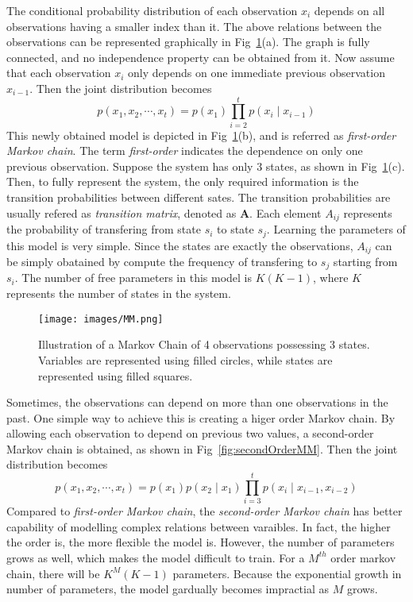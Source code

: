 The conditional probability distribution of each observation \(x_i\) depends on all observations having a smaller index than it. The above relations between the observations can be represented graphically in Fig~\ref{fig:MM}(a). The graph is fully connected, and no independence property can be obtained from it. Now assume that each observation \(x_i\) only depends on one immediate previous observation \(x_{i-1}\). Then the joint distribution becomes 
\begin{equation}
	p(x_1, x_2, \cdots, x_t) = p(x_1)\prod_{i = 2}^{t} p(x_i \mid x_{i-1})
\end{equation}
This newly obtained model is depicted in Fig~\ref{fig:MM}(b), and is referred as \textit{first-order Markov chain}. The term \textit{first-order} indicates the dependence on only one previous observation. Suppose the system has only 3 states, as shown in Fig~\ref{fig:MM}(c). Then, to fully represent the system, the only required information is the transition probabilities between different sates. The transition probabilities are usually refered as \textit{transition matrix}, denoted as \(\mathbf{A}\). Each element \(A_{ij}\) represents the probability of transfering from state \(s_i\) to state \(s_j\). Learning the parameters of this model is very simple. Since the states are exactly the observations, \(A_{ij}\) can be simply obatained by compute the frequency of transfering to \(s_j\) starting from \(s_i\). The number of free parameters in this model is \(K(K-1)\), where \(K\) represents the number of states in the system.

\begin{figure}[!ht]
	\begin{center}
		\texttt{[image: images/MM.png]}
		\caption{Illustration of a Markov Chain of 4 observations possessing 3 states. Variables are represented using filled circles, while states are represented using filled squares.}
		\label{fig:MM}
	\end{center}
\end{figure}

Sometimes, the observations can depend on more than one observations in the past. One simple way to achieve this is creating a higer order Markov chain. By allowing each observation to depend on previous two values, a second-order Markov chain is obtained, as shown in Fig~\ref{fig:secondOrderMM}. Then the joint distribution becomes
\begin{equation}
	p(x_1, x_2, \cdots, x_t) = p(x_1)p(x_2 \mid x_1)\prod_{i = 3}^{t} p(x_i \mid x_{i-1}, x_{i-2})
\end{equation}
Compared to \textit{first-order Markov chain}, the \textit{second-order Markov chain} has better capability of modelling complex relations between varaibles. In fact, the higher the order is, the more flexible the model is. However, the number of parameters grows as well, which makes the model difficult to train. For a \(M^{th}\) order markov chain, there will be \(K^{M}(K-1)\) parameters. Because the exponential growth in number of parameters, the model gardually becomes impractial as \(M\) grows. 

